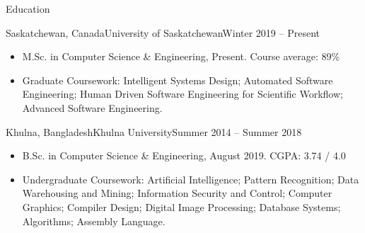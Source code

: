 \documentclass[]{mcdowellcv}
\begin{document}
	\makeheader
	
	
	
	\begin{cvsection}{Education}
		\begin{cvsubsection}{Saskatchewan, Canada}{University of Saskatchewan}{Winter 2019 -- Present}
			\begin{itemize}
				\item M.Sc. in Computer Science \& Engineering, Present. Course average: 89\%
				\item Graduate Coursework: Intelligent Systems Design; Automated Software Engineering; Human Driven Software Engineering for Scientific Workflow; Advanced Software Engineering.
				
			\end{itemize}
		\end{cvsubsection}
		\begin{cvsubsection}{Khulna, Bangladesh}{Khulna University}{Summer 2014 -- Summer 2018}
			\begin{itemize}
				\item B.Sc. in Computer Science \& Engineering, August 2019. CGPA: 3.74 / 4.0
				\item Undergraduate Coursework: Artificial Intelligence; Pattern Recognition; Data Warehousing and Mining; Information Security and Control; Computer Graphics; Compiler Design; Digital Image Processing; Database Systems; Algorithms; Assembly Language.
				
			\end{itemize}
		\end{cvsubsection}
	\end{cvsection}
	
\end{document}
